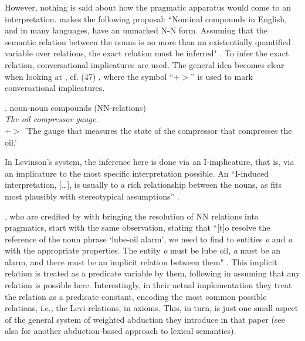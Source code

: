 However, nothing is said about how the pragmatic apparatus would come
to an interpretation. \citet{Levinson:2000} makes the following
proposal: ``Nominal compounds in English, and in many languages, have
an unmarked N-N form. Assuming that the semantic relation between the
nouns is no more than an existentially quantified variable over
relations, the exact relation must be inferred"
\citep[147]{Levinson:2000}. To infer the exact relation,
conversational implicatures are used. The general idea becomes clear
when looking at \Next, cf. (47) \citet[117]{Levinson:2000}, where the
symbol ``$+\!>$'' is used to mark conversational implicatures.

\ex.  noun-noun compounds (NN-relations)\footnotemark \\
   \emph{The oil compressor gauge.}\\
   $+\!>$ 'The gauge that measures the state of the compressor that
       compresses the oil.' 

In Levinson's system, the inference here is done via an I-implicature,
that is, via an implicature to the most specific interpretation
possible. An ``I-induced interpretation, [\dots], is usually to a
rich relationship between the nouns, as fits most plausibly with
stereotypical assumptions'' \citep[147]{Levinson:2000}. 

\citealt{Hobbsetal:1993}, who are credited by
\citet[117]{Levinson:2000} with bringing the resolution of NN relations
into pragmatics, start with the same observation, stating that ``[t]o
resolve the reference of the noun phrase `lube-oil alarm', we need to
find to entities \emph{o} and \emph{a} with the appropriate
properties. The entity \emph{o} must be lube oil, \emph{a} must be an
alarm, and there must be an implicit relation between
them" \citep{Hobbsetal:1993}. This implicit relation is treated as a
predicate variable by them, following \citet{Downing:1977} in assuming
that any relation is possible here. Interestingly, in their actual
implementation they treat the relation as a predicate constant,
encoding the most common possible relations, i.e., the Levi-relations,
in axioms. 
\enlargethispage{1\baselineskip}
This, in turn, is just one small aspect of the general
system of weighted abduction they introduce in that paper (see also
\citealt{Blutner:1998} for another abduction-based approach to lexical
semantics). 


